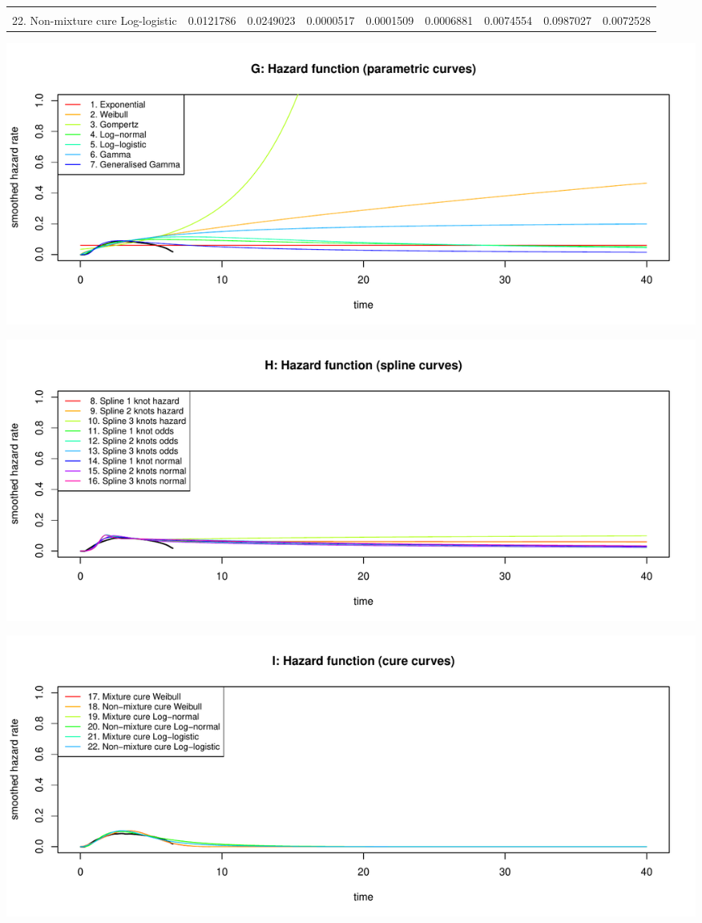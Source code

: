 \documentclass[]{article}
\begin{document}
\begin{table}
{\begin{tabular}[t]{lrrrrrrrr}
\cellcolor{gray!6}{21. Mixture cure Log-logistic} & \cellcolor{gray!6}{0.0122019} & \cellcolor{gray!6}{0.0249146} & \cellcolor{gray!6}{0.0000516} & \cellcolor{gray!6}{0.0001512} & \cellcolor{gray!6}{0.0006917} & \cellcolor{gray!6}{0.0075147} & \cellcolor{gray!6}{0.0986522} & \cellcolor{gray!6}{0.0073113}\\
22. Non-mixture cure Log-logistic & 0.0121786 & 0.0249023 & 0.0000517 & 0.0001509 & 0.0006881 & 0.0074554 & 0.0987027 & 0.0072528\\
\bottomrule
\end{tabular}}
\end{table}

\begin{flushleft}\includegraphics[height=0.29\textheight]{Images/validate_extrapolation1-7} \end{flushleft}

\begin{flushleft}\includegraphics[height=0.29\textheight]{Images/validate_extrapolation1-8} \end{flushleft}

\begin{flushleft}\includegraphics[height=0.29\textheight]{Images/validate_extrapolation1-9} \end{flushleft}
\end{document}
